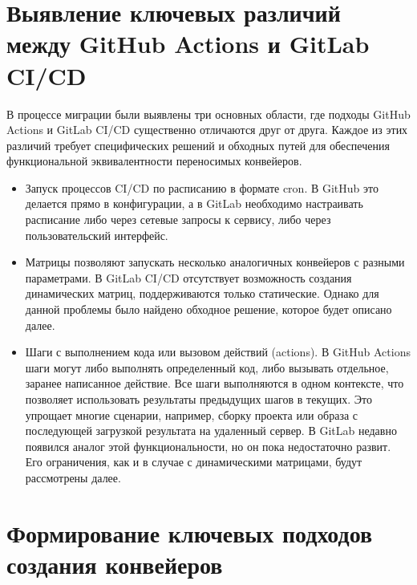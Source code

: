 \section{Выявление ключевых различий между GitHub Actions и GitLab CI/CD} \label{sec:gh-and-gl-differences}
В процессе миграции были выявлены три основных области, где подходы GitHub Actions и GitLab CI/CD существенно отличаются друг от друга.
Каждое из этих различий требует специфических решений и обходных путей для обеспечения функциональной эквивалентности переносимых конвейеров.
\begin{itemize}
  \item Запуск процессов CI/CD по расписанию в формате cron.
        В GitHub это делается прямо в конфигурации, а в GitLab необходимо настраивать расписание либо через сетевые запросы к сервису,
        либо через пользовательский интерфейс.
  \item Матрицы позволяют запускать несколько аналогичных конвейеров с разными параметрами.
        В GitLab CI/CD отсутствует возможность создания динамических матриц, поддерживаются только статические.
        Однако для данной проблемы было найдено обходное решение, которое будет описано далее.
  \item Шаги с выполнением кода или вызовом действий (actions).
        В GitHub Actions шаги могут либо выполнять определенный код, либо вызывать отдельное, заранее написанное действие.
        Все шаги выполняются в одном контексте, что позволяет использовать результаты предыдущих шагов в текущих.
        Это упрощает многие сценарии, например, сборку проекта или образа с последующей загрузкой результата на удаленный сервер.
        В GitLab недавно появился аналог этой функциональности, но он пока недостаточно развит.
        Его ограничения, как и в случае с динамическими матрицами, будут рассмотрены далее.
\end{itemize}

\section{Формирование ключевых подходов создания конвейеров} \label{sec:gitlab-pipelines-key-principles}
